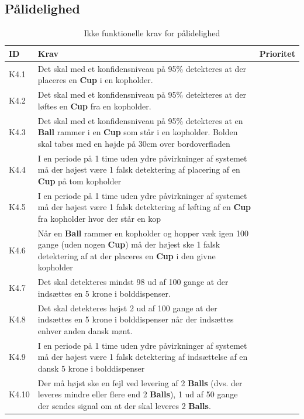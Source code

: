 \documentclass[Kravspecifikation/Kravspec_Main.tex]{subfiles}
\begin{document}
\subsection{Pålidelighed}
\begin{table}[H]
\begin{tabular}{|L{0.1\textwidth}|L{0.75\textwidth}|L{0.15\textwidth}|}
\hline
\textbf{ID} & \textbf{Krav} & \textbf{Prioritet} \\ \hline
K4.1 & Det skal med et konfidensniveau på 95\% detekteres at der placeres en \textbf{Cup} i en kopholder.  &  \\ \hline
K4.2 & Det skal med et konfidensniveau på 95\% detekteres at der løftes en \textbf{Cup} fra en kopholder.  &  \\ \hline
K4.3 & Det skal med et konfidensniveau på 95\% detekteres at en \textbf{Ball} rammer i  en \textbf{Cup} som står i en kopholder. Bolden skal tabes med en højde på 30cm over bordoverfladen &  \\ \hline
K4.4 & I en periode på 1 time uden ydre påvirkninger af systemet må der højest være 1 falsk detektering af placering af en \textbf{Cup} på tom kopholder &  \\ \hline
K4.5 & I en periode på 1 time uden ydre påvirkninger af systemet må der højest være 1 falsk detektering af løfting af en \textbf{Cup} fra kopholder hvor der står en kop&  \\ \hline
K4.6 & Når en \textbf{Ball} rammer en kopholder og hopper væk igen 100 gange (uden nogen \textbf{Cup}) må der højest ske 1 falsk detektering af at der placeres en \textbf{Cup} i den givne kopholder&  \\ \hline
K4.7 & Det skal detekteres mindst 98 ud af 100 gange at der indsættes en 5 krone i bolddispenser. &  \\ \hline
K4.8 & Det skal detekteres højst 2 ud af 100 gange at der indsættes en 5 krone i bolddispenser når der indsættes enhver anden dansk mønt. &  \\ \hline
K4.9 & I en periode på 1 time uden ydre påvirkninger af systemet må der højest være 1 falsk detektering af indsættelse af en dansk 5 krone i bolddispenser &  \\ \hline
K4.10 & Der må højst ske en fejl ved levering af 2 \textbf{Balls} (dvs. der leveres mindre eller flere end 2 \textbf{Balls}), 1 ud af 50 gange der sendes signal om at der skal leveres 2 \textbf{Balls}.  &  \\ \hline


\end{tabular}
\caption{Ikke funktionelle krav for pålidelighed}
\label{tab:reliability}
\end{table}
\end{document}

